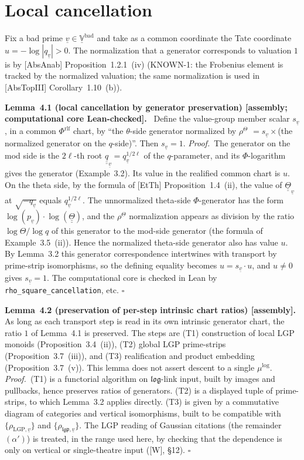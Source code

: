 \documentclass[11pt]{article}
\newcommand{\uu}[1]{\underline{\underline{#1}}}
\newcommand{\stmt}[2]{\medskip\noindent\textbf{#1\ #2.}\ }
\newcommand{\pf}{\medskip\noindent\textit{Proof.}\ }
\newcommand{\qedh}{\hfill\(\square\)\par\medskip}
\begin{document}
\section{Local cancellation}

Fix a bad prime $\underline v\in\underline{\mathbb V}^{\mathrm{bad}}$
and take as a common coordinate the Tate coordinate
$u=-\log|q_{\underline v}|>0$.  The normalization that a generator
corresponds to valuation $1$ is by [AbsAnab] Proposition~1.2.1~(iv)
(KNOWN-1: the Frobenius element is tracked by the normalized
valuation; the same normalization is used in [AbsTopIII]
Corollary~1.10~(b)).

\stmt{Lemma}{4.1 (local cancellation by generator preservation) [assembly; computational core Lean-checked]}
Define the value-group member scalar $s_{\underline v}$, in a common
$\Phi^{\mathrm{rlf}}$ chart, by ``the $\theta$-side generator
normalized by $\rho^{\Theta}$ $=s_{\underline v}\times{}$(the
normalized generator on the $q$-side)''.  Then
$s_{\underline v}=1$.
\pf The generator on the mod side is the $2\ell$-th root
$\uu q_{\underline v}=q_{\underline v}^{1/2\ell}$ of the
$q$-parameter, and its $\Phi$-logarithm gives the generator
(Example~3.2).  Its value in the realified common chart is $u$.  On
the theta side, by the formula of [EtTh] Proposition~1.4~(ii), the
value of $\uu\Theta_{\underline v}$ at $\sqrt{-q_{\underline v}}$
equals $q_{\underline v}^{1/2\ell}$.  The unnormalized theta-side
$\Phi$-generator has the form
$\log(p_{\underline v})\cdot\log(\uu\Theta)$, and the
$\rho^{\Theta}$ normalization appears as division by the ratio
$\log\Theta/\log q$ of this generator to the mod-side generator
(the formula of Example~3.5~(ii)).  Hence the normalized theta-side
generator also has value $u$.  By Lemma~3.2 this generator
correspondence intertwines with transport by prime-strip
isomorphisms, so the defining equality becomes
$u=s_{\underline v}\cdot u$, and $u\ne0$ gives
$s_{\underline v}=1$.  The computational core is checked in Lean by
\texttt{rho\_square\_cancellation}, etc. \qedh

\stmt{Lemma}{4.2 (preservation of per-step intrinsic chart ratios) [assembly]}
As long as each transport step is read in its own intrinsic
generator chart, the ratio $1$ of Lemma~4.1 is preserved.  The steps
are (T1) construction of local LGP monoids (Proposition~3.4~(ii)),
(T2) global LGP prime-strips (Proposition~3.7~(iii)), and (T3)
realification and product embedding (Proposition~3.7~(v)).  This
lemma does not assert descent to a single $\mu^{\log}$.
\pf (T1) is a functorial algorithm on $\mathfrak{log}$-link input,
built by images and pullbacks, hence preserves ratios of
generators.  (T2) is a displayed tuple of prime-strips, to which
Lemma~3.2 applies directly.  (T3) is given by a commutative diagram
of categories and vertical isomorphisms, built to be compatible
with $\{\rho_{\mathrm{LGP},\underline v}\}$ and
$\{\rho_{\mathfrak{lgp},\underline v}\}$.  The LGP reading of
Gaussian citations (the remainder $(\alpha')$) is treated, in the
range used here, by checking that the dependence is only on
vertical or single-theatre input ([W], \S12). \qedh
\end{document}
